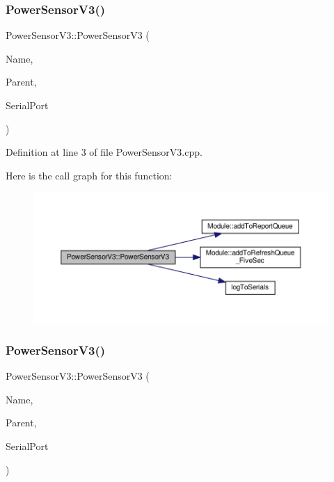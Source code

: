 \subsubsection{\texorpdfstring{Power\+Sensor\+V3()}{PowerSensorV3()}\hspace{0.1cm}{\footnotesize\ttfamily [1/2]}}
{\footnotesize\ttfamily Power\+Sensor\+V3\+::\+Power\+Sensor\+V3 (\begin{DoxyParamCaption}\item[{const \+\_\+\+\_\+\+Flash\+String\+Helper $\ast$}]{Name,  }\item[{\hyperlink{class_module}{Module} $\ast$}]{Parent,  }\item[{Hardware\+Serial $\ast$}]{Serial\+Port }\end{DoxyParamCaption})}



Definition at line 3 of file Power\+Sensor\+V3.\+cpp.

Here is the call graph for this function\+:
\nopagebreak
\begin{figure}[H]
\begin{center}
\leavevmode
\includegraphics[width=350pt]{class_power_sensor_v3_a254a0502c2a42a5ccff07147a8a6ccfc_cgraph}
\end{center}
\end{figure}
\mbox{\label{class_power_sensor_v3_a254a0502c2a42a5ccff07147a8a6ccfc}} 
\subsubsection{\texorpdfstring{Power\+Sensor\+V3()}{PowerSensorV3()}\hspace{0.1cm}{\footnotesize\ttfamily [2/2]}}
{\footnotesize\ttfamily Power\+Sensor\+V3\+::\+Power\+Sensor\+V3 (\begin{DoxyParamCaption}\item[{const \+\_\+\+\_\+\+Flash\+String\+Helper $\ast$}]{Name,  }\item[{\hyperlink{class_module}{Module} $\ast$}]{Parent,  }\item[{Hardware\+Serial $\ast$}]{Serial\+Port }\end{DoxyParamCaption})}




